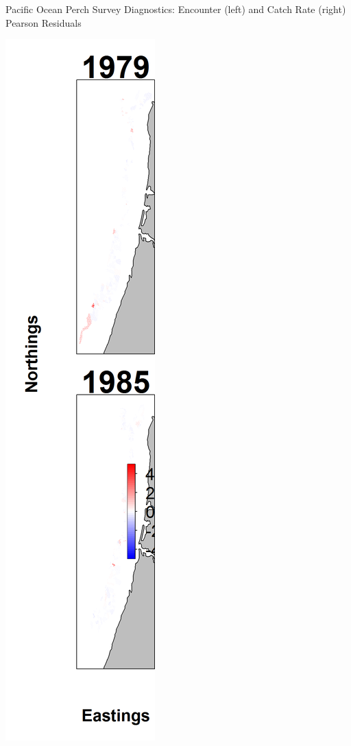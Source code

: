 \documentclass[pdf]{beamer}\usepackage[]{graphicx}\usepackage[]{color}
\begin{document}
\begin{frame}{Pacific Ocean Perch Survey Diagnostics: Encounter (left) and Catch Rate (right) Pearson Residuals}
\begin{center}
  \includegraphics[scale = 0.23]{figures/POP_maps--catchrate_pearson_resid.png}
  \end{center}
\end{frame}
\end{document}
